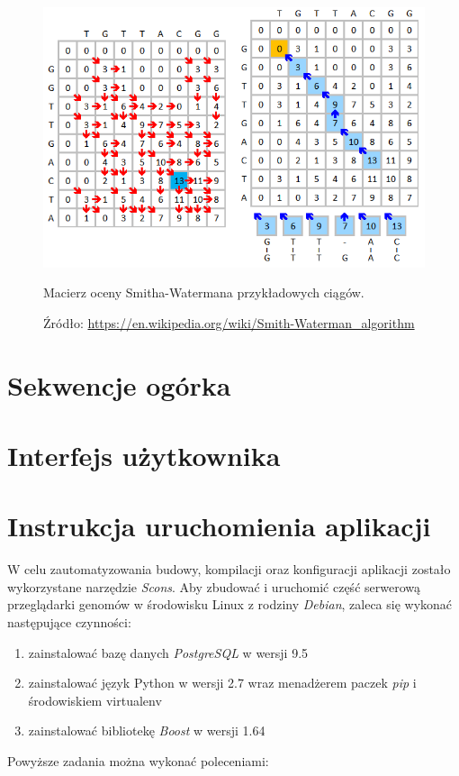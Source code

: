 \begin{figure}[h]
	\centering
	\includegraphics[width=1\textwidth]{img/Smith-Waterman-Algorithm-Example-Step2-and-3.png}
	\caption{Macierz oceny Smitha-Watermana przykładowych ciągów.}
	\label{img:Smith-Waterman-kroki-2-3}
	\vspace{-0.5cm}
	\caption*{\scriptsize Źródło: 
		\url{https://en.wikipedia.org/wiki/Smith-Waterman\_algorithm}
	}
\end{figure}








\section{Sekwencje ogórka}

\section{Interfejs użytkownika}

\section{Instrukcja uruchomienia aplikacji}
W celu zautomatyzowania budowy, kompilacji oraz konfiguracji aplikacji zostało wykorzystane narzędzie \textit{Scons}.
Aby zbudować i uruchomić część serwerową przeglądarki genomów w środowisku Linux z rodziny \textit{Debian}, zaleca się wykonać następujące czynności:
\begin{enumerate}
	\item zainstalować bazę danych \textit{PostgreSQL} w wersji 9.5
	\item zainstalować język Python w wersji 2.7 wraz menadżerem paczek \textit{pip} i środowiskiem virtualenv
	\item zainstalować bibliotekę \textit{Boost} w wersji 1.64
\end{enumerate}
Powyższe zadania można wykonać poleceniami:

